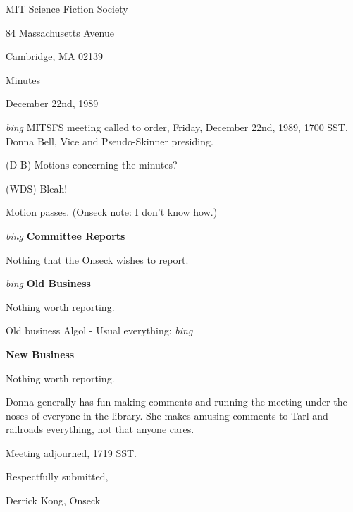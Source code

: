 \setlength{\topmargin}{-0.5in}
\setlength{\oddsidemargin}{-0.60in}
\setlength{\textheight}{9in}
\setlength{\textwidth}{6.5in}



\begin{center}
MIT Science Fiction Society

84 Massachusetts Avenue

Cambridge, MA 02139

\vspace{0.2in}
Minutes

December 22nd, 1989

\end{center}
 
\vspace{0.15in}
{\em bing\/}  MITSFS meeting called to order, Friday, December 22nd, 1989,
1700 SST, Donna Bell, Vice and Pseudo-Skinner presiding.

(D B) Motions concerning the minutes?

(WDS) Bleah!

Motion passes.  (Onseck note: I don't know how.)

\vspace{0.15in}
{\em bing\/}  {\bf Committee Reports}

Nothing that the Onseck wishes to report.

\vspace{0.15in}
{\em bing\/}  {\bf Old Business}

Nothing worth reporting.

Old business Algol - Usual everything: {\em bing\/}

\vspace{0.15in}
{\bf New Business}

Nothing worth reporting.

Donna generally has fun making comments and running the meeting under
the noses of everyone in the library.  She makes amusing comments to
Tarl and railroads everything, not that anyone cares. 

Meeting adjourned, 1719 SST.

\vspace{0.15in}
\begin{center}
Respectfully submitted,

Derrick Kong, Onseck
\end{center}

